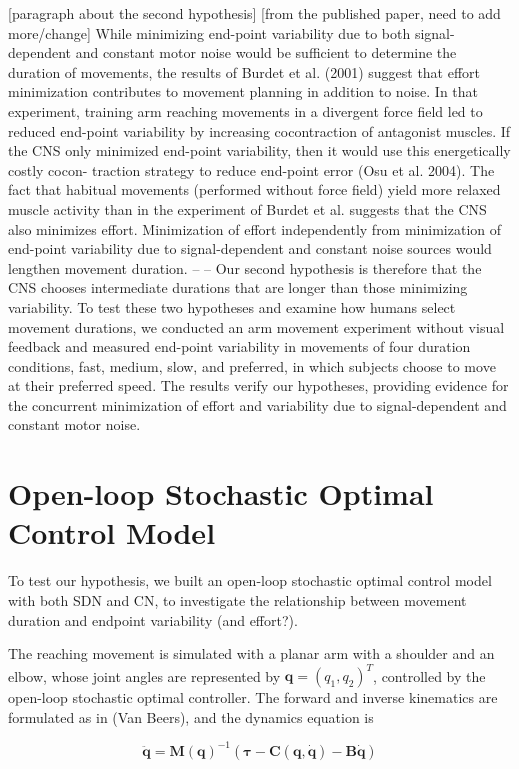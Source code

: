 [paragraph about the second hypothesis] [from the published paper, need to add more/change] While minimizing end-point variability due to both signal- dependent and constant motor noise would be sufficient to determine the duration of movements, the results of Burdet et al. (2001) suggest that effort minimization contributes to movement planning in addition to noise. In that experiment, training arm reaching movements in a divergent force field led to reduced end-point variability by increasing cocontraction of antagonist muscles. If the CNS only minimized end-point variability, then it would use this energetically costly cocon- traction strategy to reduce end-point error (Osu et al. 2004). The fact that habitual movements (performed without force field) yield more relaxed muscle activity than in the experiment of Burdet et al. suggests that the CNS also minimizes effort. Minimization of effort independently from minimization of end-point variability due to signal-dependent and constant noise sources would lengthen movement duration.  -- -- Our second hypothesis is therefore that the CNS chooses intermediate durations that are longer than those minimizing variability. To test these two hypotheses and examine how humans select movement durations, we conducted an arm movement experiment without visual feedback and measured end-point variability in movements of four duration conditions, fast, medium, slow, and preferred, in which subjects choose to move at their preferred speed. The results verify our hypotheses, providing evidence for the concurrent minimization of effort and variability due to signal-dependent and constant motor noise.

\section{Open-loop Stochastic Optimal Control Model}
To test our hypothesis, we built an open-loop stochastic optimal control model with both SDN and CN, to investigate the relationship between movement duration and endpoint variability (and effort?).

The reaching movement is simulated with a planar arm with a shoulder and an elbow, whose joint angles are represented by $\bm{q} = (q_1, q_2)^T$, controlled by the open-loop stochastic optimal controller. 
The forward and inverse kinematics are formulated as in (Van Beers), and the dynamics equation is

\begin{equation} \label{maindynamics}
	\ddot{\bm{q}} = \bm{M}(\bm{q})^{-1} (\bm{\tau} - \bm{C}(\bm{q}, \dot{\bm{q}}) - \bm{B}\dot{\bm{q}})
\end{equation}

